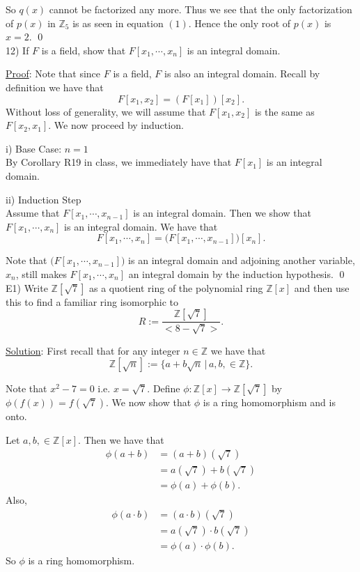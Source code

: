 \documentclass{article}
\begin{document}
So $q(x)$ cannot be factorized any more. Thus we see that the only factorization of $p(x)$ in $\mathbb{Z}_5$ is as seen in equation $(1)$. Hence the only root of $p(x)$ is $x = 2$. \qed \\

12) If $F$ is a field, show that $F[x_1, \cdots, x_n]$ is an integral domain.

\underline{Proof}: Note that since $F$ is a field, $F$ is also an integral domain. Recall by definition we have that $$F[x_1, x_2] = (F[x_1])[x_2].$$ Without loss of generality, we will assume that $F[x_1, x_2]$ is the same as $F[x_2, x_1]$. We now proceed by induction.

i) Base Case: $n = 1$ \\
By Corollary R19 in class, we immediately have that $F[x_1]$ is an integral domain.

ii) Induction Step \\
Assume that $F[x_1, \cdots, x_{n-1}]$ is an integral domain. Then we show that $F[x_1, \cdots ,x_n]$ is an integral domain. We have that
$$ F[x_1, \cdots, x_n] = \big( F[x_1, \cdots ,x_{n-1}] \big) [x_n].$$

Note that $\big(F[x_1, \cdots ,x_{n-1}]\big)$ is an integral domain and adjoining another variable, $x_n$, still makes $F[x_1, \cdots ,x_n]$ an integral domain by the induction hypothesis. \qed \\

E1) Write $\mathbb{Z}[\sqrt{7}]$ as a quotient ring of the polynomial ring $\mathbb{Z}[x]$ and then use this to find a familiar ring isomorphic to
$$R := \frac{\mathbb{Z}[\sqrt{7}]}{<8-\sqrt{7}>}.$$

\underline{Solution}: First recall that for any integer $n \in \mathbb{Z}$ we have that
$$ \mathbb{Z}[\sqrt{n}] := \{ a+b\sqrt{n} \, \vert \, a, b, \in \mathbb{Z} \}. $$

Note that $x^2 - 7 = 0$ i.e. $x = \sqrt{7}$. Define $\phi: \mathbb{Z}[x] \to \mathbb{Z}[\sqrt{7}]$ by $\phi(f(x)) = f(\sqrt{7})$. We now show that $\phi$ is a ring homomorphism and is onto.

Let $a, b, \in \mathbb{Z}[x]$. Then we have that
\begin{align*}
	\phi(a+b) &= (a+b)(\sqrt{7}) \\
	&= a(\sqrt{7}) + b(\sqrt{7}) \\
	&= \phi(a) + \phi(b).
\end{align*}
Also,
\begin{align*}
	\phi(a \cdot b) &= (a \cdot b)(\sqrt{7}) \\
	&= a(\sqrt{7}) \cdot b(\sqrt{7}) \\
	&= \phi(a) \cdot \phi(b).
\end{align*}
So $\phi$ is a ring homomorphism.
\end{document}
